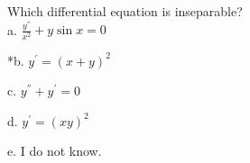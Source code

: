 
Which differential equation is inseparable? \\


a. \(\frac{y^{''}}{x^{2}} + y\sin x = 0\)

*b. \( y^{'} = ( x + y )^{2} \)

c. \( y^{''} + y^{'} = 0 \)

d. \( y^{'} = ( xy )^{2} \)

e. I do not know. \\
